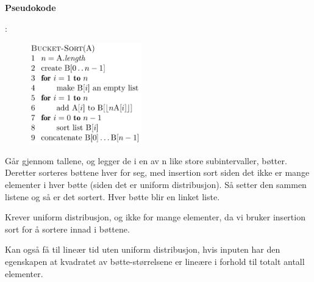 \documentclass[12pt]{report}
\begin{document}
{\fontsize{14pt}{16.8pt}\selectfont \textbf{Pseudokode}\par}:\par




\begin{figure}[H]
	\begin{Center}
		\includegraphics[width=1.92in,height=1.72in]{./media/image39.png}
	\end{Center}
\end{figure}



\par


\vspace{\baselineskip}

\vspace{\baselineskip}

\vspace{\baselineskip}

\vspace{\baselineskip}
\textcolor[HTML]{353535}{Går gjennom tallene, og legger de i en av n like store subintervaller, bøtter. Deretter sorteres bøttene hver for seg, med insertion sort siden det ikke er mange elementer i hver bøtte (siden det er uniform distribusjon). Så setter den sammen listene og så er det sortert. Hver bøtte blir en linket liste. }\par


\vspace{\baselineskip}
Krever uniform distribusjon, og ikke for mange elementer, da vi bruker insertion sort for å sortere innad i bøttene. \par

Kan også få til lineær tid uten uniform distribusjon, hvis inputen har den egenskapen at kvadratet av bøtte-størrelsene er lineære i forhold til totalt antall elementer. \par
\end{document}
